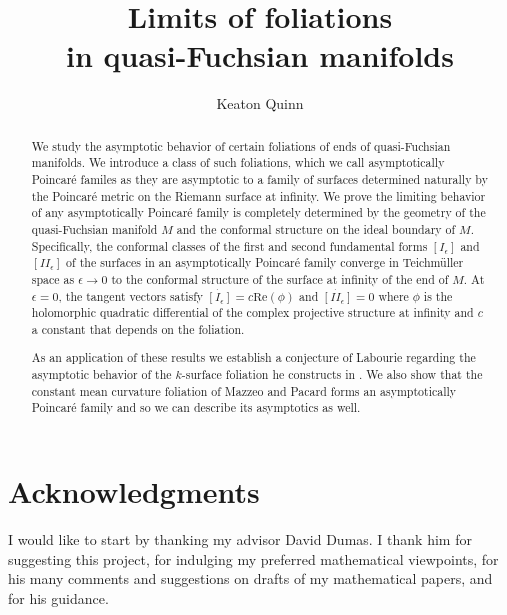 \documentclass{amsart}
\newcommand{\two}{I\!\!I}
\begin{document}
\title{Limits of foliations \\ in quasi-Fuchsian manifolds}

\author{Keaton Quinn}

\maketitle


\begin{abstract}
We study the asymptotic behavior of certain foliations of ends of quasi-Fuchsian manifolds. 
We introduce a class of such foliations, which we call asymptotically Poincar\'e familes as they are asymptotic to a family of surfaces determined naturally by the Poincar\'e metric on the Riemann surface at infinity.
We prove the limiting behavior of any asymptotically Poincar\'e family is completely determined by the geometry of the quasi-Fuchsian manifold $M$ and the conformal structure on the ideal boundary of $M$. 
Specifically, the conformal classes of the first and second fundamental forms $[I_\epsilon]$ and $[\two_\epsilon]$ of the surfaces in an asymptotically Poincar\'e family converge in Teichm\"uller space as $\epsilon \to 0$ to the conformal structure of the surface at infinity of the end of $M$.
At $\epsilon  = 0$, the tangent vectors satisfy $\dot{[I_\epsilon]} = c \mathrm{Re}(\phi)$ and $\dot{[\two_\epsilon]} = 0$ where $\phi$ is the holomorphic quadratic differential of the complex projective structure at infinity and $c$ a constant that depends on the foliation. 

As an application of these results we establish a conjecture of Labourie regarding the asymptotic behavior of the $k$-surface foliation he constructs in \cite{labourie1992}.
We also show that the constant mean curvature foliation of Mazzeo and Pacard \cite{mazzeo-pacard2011} forms an asymptotically Poincar\'e family and so we can describe its asymptotics as well. 
\end{abstract}



\section*{Acknowledgments}


I would like to start by thanking my advisor David Dumas.
I thank him for suggesting this project, for indulging my preferred mathematical viewpoints, for his many comments and suggestions on drafts of my mathematical papers, and for his guidance.
\end{document}
